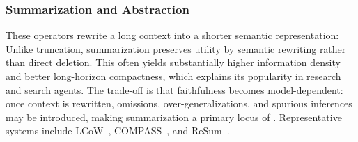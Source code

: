 \subsubsection{Summarization and Abstraction} 
These operators rewrite a long context into a shorter semantic representation:
Unlike truncation, summarization preserves utility by semantic rewriting rather than direct deletion. This often yields substantially higher information density and better long-horizon compactness, which explains its popularity in research and search agents. The trade-off is that faithfulness becomes model-dependent: once context is rewritten, omissions, over-generalizations, and spurious inferences may be introduced, making summarization a primary locus of \ftwo. Representative systems include LCoW~\citep{lee2025learningcontextualizewebpages}, COMPASS~\citep{wan2025compassenhancingagentlonghorizon}, and ReSum~\citep{wu2026resumunlockinglonghorizonsearch}.




